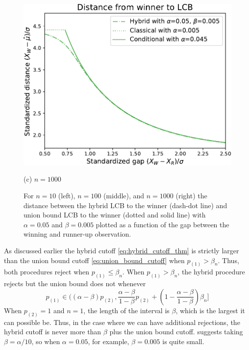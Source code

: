 \documentclass{article}
\begin{document}
\begin{appendix}
\begin{figure}
\begin{minipage}{0.32\textwidth}
    \end{minipage}
    \hfill
    \hspace{0.01\textwidth}
    \begin{minipage}{0.32\textwidth}
        \centering
        \includegraphics[width=\textwidth]{fig/hyb_dist_to_winner_n=1000.pdf}
        \caption*{(c) $n=1000$}
    \end{minipage}
    \caption{ For $n=10$ (left), $n=100$ (middle), and $n=1000$ (right) the distance between the hybrid LCB to the winner (dash-dot line) and union bound LCB to the winner (dotted and solid line) with $\alpha=0.05$ and $\beta=0.005$ plotted as a function of the gap between the winning and runner-up observation.}
    \label{fig:hybrid_union}
\end{figure}

As discussed earlier the hybrid cutoff \eqref{eq:hybrid_cutoff_thm} is strictly larger than the union bound cutoff \eqref{eq:union_bound_cutoff} when $p_{(1)} > \beta_n$. Thus, both procedures reject when $p_{(1)} \leq \beta_n$. When $p_{(1)} > \beta_n$, the hybrid procedure rejects but the union bound does not whenever  
\begin{equation*}
    p_{(1)} \in \bigg((\alpha - \beta)p_{(2)},  \frac{\alpha - \beta}{1-\beta}p_{(2)} + \left(1 -  \frac{\alpha - \beta}{1-\beta}\right)\beta_n \bigg]
\end{equation*}
When $p_{(2)} = 1$ and $n=1$, the length of the interval is $\beta$, which is the largest it can possible be. Thus, in the case where we can have additional rejections, the hybrid cutoff is never more than $\beta$ plus the union bound cutoff. \cite{Andrews2023} suggests taking $\beta=\alpha/10$, so when $\alpha = 0.05$, for example, $\beta=0.005$ is quite small. 


\end{appendix}
\end{document}
